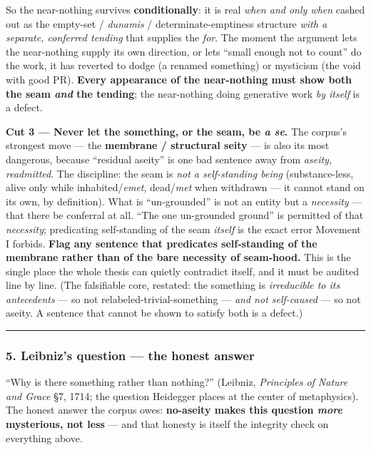 \documentclass[11pt]{article}
\begin{document}
So the near-nothing survives \textbf{conditionally}: it is real \emph{when and only when} cashed out as the empty-set /\allowbreak{} \emph{dunamis} /\allowbreak{} determinate-emptiness structure \emph{with a separate, conferred tending} that supplies the \emph{for}. The moment the argument lets the near-nothing supply its own direction, or lets ``small enough not to count'' do the work, it has reverted to dodge (a renamed something) or mysticism (the void with good PR). \textbf{Every appearance of the near-nothing must show both the seam \emph{and} the tending}; the near-nothing doing generative work \emph{by itself} is a defect.

\textbf{Cut 3 — Never let the something, or the seam, be \emph{a se}.} The corpus's strongest move — the \textbf{membrane /\allowbreak{} structural seity} — is also its most dangerous, because ``residual aseity'' is one bad sentence away from \emph{aseity, readmitted}. The discipline: the seam is \emph{not a self-standing being} (substance-less, alive only while inhabited/\allowbreak{}\emph{emet}, dead/\allowbreak{}\emph{met} when withdrawn — it cannot stand on its own, by definition). What is ``un-grounded'' is not an entity but a \emph{necessity} — that there be conferral at all. ``The one un-grounded ground'' is permitted of that \emph{necessity}; predicating self-standing of the seam \emph{itself} is the exact error Movement I forbids. \textbf{Flag any sentence that predicates self-standing of the membrane rather than of the bare necessity of seam-hood.} This is the single place the whole thesis can quietly contradict itself, and it must be audited line by line. (The falsifiable core, restated: the something is \emph{irreducible to its antecedents} — so not relabeled-trivial-something — \emph{and not self-caused} — so not aseity. A sentence that cannot be shown to satisfy both is a defect.)

\medskip\noindent\rule{\linewidth}{0.3pt}\medskip

\subsubsection*{5. Leibniz's question — the honest answer}

``Why is there something rather than nothing?'' (Leibniz, \emph{Principles of Nature and Grace} §7, 1714; the question Heidegger places at the center of metaphysics). The honest answer the corpus owes: \textbf{no-aseity makes this question \emph{more} mysterious, not less} — and that honesty is itself the integrity check on everything above.
\end{document}
